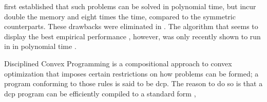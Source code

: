 \documentclass{article}
\begin{document}
\textcite*{nesterov1996infeasible} first established that such problems can be solved in polynomial time, but incur double the memory and eight times the time, compared to the symmetric counterparts. These drawbacks were eliminated in \cite{skajaa2015homogeneous}.
The algorithm that seems to display the best empirical performance \parencite{dahl2022primal}, however, was only recently shown to
run in
in polynomial time \parencite{badenbroek2021algorithm}.

Disciplined Convex Programming \parencite{dcp-thesis} is a
compositional approach to convex 
optimization that imposes
certain 
restrictions on how problems can be formed;
a program 
conforming to
those rules is said to be dcp.
The reason to do so is that a dcp program can be efficiently compiled to a
standard form \parencite{agrawal2018rewriting}, 
\end{document}
